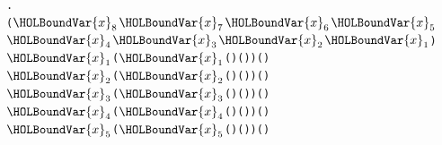 \documentclass{article}
\begin{document}
\begin{alltt}
\HOLTokenTurnstile{} \HOLSymConst{\HOLTokenForall{}} .
        \HOLSymConst{=}
     \HOLTokenLeftbrace{}(\ensuremath{\HOLBoundVar{x}\sb{\mathrm{8}}}\HOLSymConst{,}\ensuremath{\HOLBoundVar{x}\sb{\mathrm{7}}}\HOLSymConst{,}\ensuremath{\HOLBoundVar{x}\sb{\mathrm{6}}}\HOLSymConst{,}\ensuremath{\HOLBoundVar{x}\sb{\mathrm{5}}}\HOLSymConst{,}\ensuremath{\HOLBoundVar{x}\sb{\mathrm{4}}}\HOLSymConst{,}\ensuremath{\HOLBoundVar{x}\sb{\mathrm{3}}}\HOLSymConst{,}\ensuremath{\HOLBoundVar{x}\sb{\mathrm{2}}}\HOLSymConst{,}\ensuremath{\HOLBoundVar{x}\sb{\mathrm{1}}}) \HOLTokenBar{}
       \ensuremath{\HOLBoundVar{x}\sb{\mathrm{1}}} \HOLSymConst{\HOLTokenEor{}}  (\ensuremath{\HOLBoundVar{x}\sb{\mathrm{1}}} \HOLSymConst{\HOLTokenEor{}} ( \HOLSymConst{\HOLTokenExtract{}} ) ( )) \HOLSymConst{=} ( \HOLSymConst{\HOLTokenExtract{}} )  \HOLSymConst{\HOLTokenConj{}}
       \ensuremath{\HOLBoundVar{x}\sb{\mathrm{2}}} \HOLSymConst{\HOLTokenEor{}}  (\ensuremath{\HOLBoundVar{x}\sb{\mathrm{2}}} \HOLSymConst{\HOLTokenEor{}} ( \HOLSymConst{\HOLTokenExtract{}} ) ( )) \HOLSymConst{=} ( \HOLSymConst{\HOLTokenExtract{}} )  \HOLSymConst{\HOLTokenConj{}}
       \ensuremath{\HOLBoundVar{x}\sb{\mathrm{3}}} \HOLSymConst{\HOLTokenEor{}}  (\ensuremath{\HOLBoundVar{x}\sb{\mathrm{3}}} \HOLSymConst{\HOLTokenEor{}} ( \HOLSymConst{\HOLTokenExtract{}} ) ( )) \HOLSymConst{=} ( \HOLSymConst{\HOLTokenExtract{}} )  \HOLSymConst{\HOLTokenConj{}}
       \ensuremath{\HOLBoundVar{x}\sb{\mathrm{4}}} \HOLSymConst{\HOLTokenEor{}}  (\ensuremath{\HOLBoundVar{x}\sb{\mathrm{4}}} \HOLSymConst{\HOLTokenEor{}} ( \HOLSymConst{\HOLTokenExtract{}} ) ( )) \HOLSymConst{=} ( \HOLSymConst{\HOLTokenExtract{}} )  \HOLSymConst{\HOLTokenConj{}}
       \ensuremath{\HOLBoundVar{x}\sb{\mathrm{5}}} \HOLSymConst{\HOLTokenEor{}}  (\ensuremath{\HOLBoundVar{x}\sb{\mathrm{5}}} \HOLSymConst{\HOLTokenEor{}} ( \HOLSymConst{\HOLTokenExtract{}} ) ( )) \HOLSymConst{=} ( \HOLSymConst{\HOLTokenExtract{}} )  \HOLSymConst{\HOLTokenConj{}}

\end{alltt}
\end{document}
